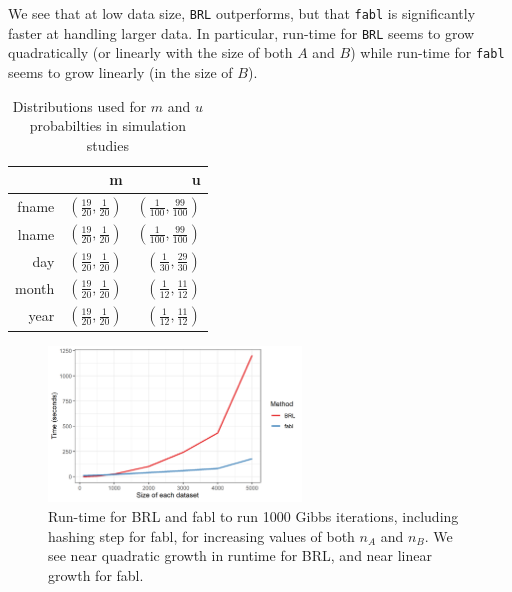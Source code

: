 \documentclass[12pt,letterpaper]{article}
\newcommand{\1}[1]{\mathbb{I}\!\left[#1\right]} %
\begin{document}
We see that at low data size, \texttt{BRL} outperforms, but that
\texttt{fabl} is significantly faster at handling larger data. In
particular, run-time for \texttt{BRL} seems to grow quadratically (or
linearly with the size of both \(A\) and \(B\)) while run-time for
\texttt{fabl} seems to grow linearly (in the size of \(B\)).

\begin{table}[h!]
	\centering
	\begin{tabular}{rrr}
		\hline
		& m & u \\ 
		\hline
		fname & $\left(\frac{19}{20}, \frac{1}{20}\right)$ & $\left(\frac{1}{100}, \frac{99}{100}\right)$ \\ 
		lname & $\left(\frac{19}{20}, \frac{1}{20}\right)$ & $\left(\frac{1}{100}, \frac{99}{100}\right)$ \\ 
		day & $\left(\frac{19}{20}, \frac{1}{20}\right)$ & $\left(\frac{1}{30}, \frac{29}{30}\right)$ \\ 
		month & $\left(\frac{19}{20}, \frac{1}{20}\right)$ & $\left(\frac{1}{12}, \frac{11}{12}\right)$ \\ 
		year & $\left(\frac{19}{20}, \frac{1}{20}\right)$ & $\left(\frac{1}{12}, \frac{11}{12}\right)$ \\ 
		\hline
	\end{tabular}
\caption{Distributions used for $m$ and $u$ probabilties in simulation studies}\label{Tab:distributions}
\end{table}


\begin{figure}[h!]
	
	{\centering \includegraphics[width=0.6\textwidth]{../notes/figures/sadinle_speed_plot2} 
		
	}
	
	\caption{Run-time for BRL and fabl to run 1000 Gibbs iterations, including hashing step for fabl, for increasing values of both $n_A$ and $n_B$. We see near quadratic growth in runtime for BRL, and near linear growth for fabl.}\label{fig:speed1}
\end{figure}
\end{document}
